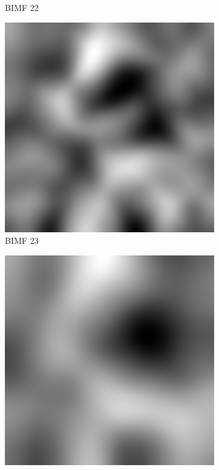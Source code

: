 \begin{figure}
\begin{subfigure}{.30\textwidth}
  \caption{BIMF 22}
\end{subfigure}
\begin{subfigure}{.30\textwidth}
  \centering
  \includegraphics[width=.9\linewidth]{img/e_1_1_23}
  \caption{BIMF 23}
\end{subfigure}
\begin{subfigure}{.30\textwidth}
  \centering
  \includegraphics[width=.9\linewidth]{img/e_1_1_24}

\end{subfigure}
\end{figure}
